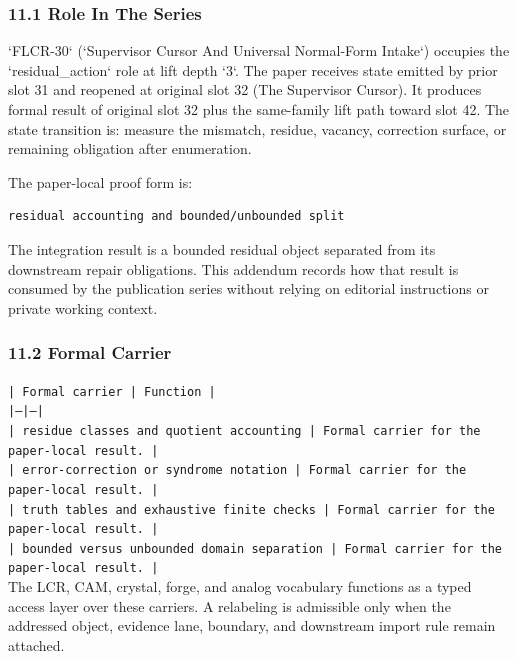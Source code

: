 \documentclass[11pt]{article}
\begin{document}
\subsubsection*{11.1 Role In The Series}

`FLCR-30` (`Supervisor Cursor And Universal Normal-Form Intake`) occupies the `residual\_action` role at lift depth `3`.
The paper receives state emitted by prior slot 31 and reopened at original slot 32 (The Supervisor Cursor). It produces formal result of original slot 32 plus the same-family lift path toward slot 42. The state transition is:
measure the mismatch, residue, vacancy, correction surface, or remaining obligation after enumeration.

The paper-local proof form is:

\begin{verbatim}
residual accounting and bounded/unbounded split
\end{verbatim}

The integration result is a bounded residual object separated from its downstream repair obligations. This addendum records how that result is
consumed by the publication series without relying on editorial instructions or
private working context.

\subsubsection*{11.2 Formal Carrier}

\noindent\texttt{| Formal carrier | Function |}\\
\noindent\texttt{|---|---|}\\
\noindent\texttt{| residue classes and quotient accounting | Formal carrier for the paper-local result. |}\\
\noindent\texttt{| error-correction or syndrome notation | Formal carrier for the paper-local result. |}\\
\noindent\texttt{| truth tables and exhaustive finite checks | Formal carrier for the paper-local result. |}\\
\noindent\texttt{| bounded versus unbounded domain separation | Formal carrier for the paper-local result. |}\\

The LCR, CAM, crystal, forge, and analog vocabulary functions as a typed access
layer over these carriers. A relabeling is admissible only when the addressed
object, evidence lane, boundary, and downstream import rule remain attached.
\end{document}

